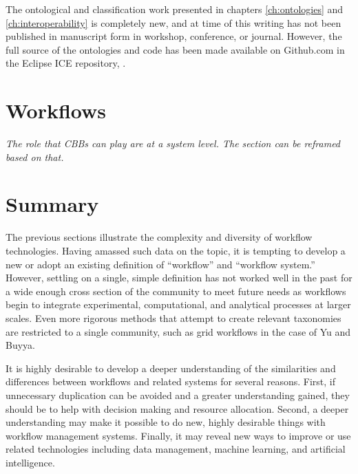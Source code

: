 The ontological and classification work presented in chapters
\ref{ch:ontologies} and \ref{ch:interoperability} is completely new, and at
time of this writing has not been published in manuscript form in
workshop, conference, or journal. However, the full source of the ontologies
and code has been made available on Github.com in the Eclipse ICE repository,
\cite{billings_ice}.


\section{Workflows}

\textit{The role that CBBs can play are at a system level. The section can be
reframed based on that.}


\section{Summary}

The previous sections illustrate the complexity and diversity of workflow
technologies. Having amassed such data on the topic, it is tempting to develop
a new or adopt an existing definition of ``workflow'' and ``workflow system.''
However, settling on a single, simple definition has not worked well in the past
for a wide enough cross section of the community to meet future needs as workflows
begin to integrate experimental, computational, and analytical processes at
larger scales. Even more rigorous methods that attempt to create relevant
taxonomies are restricted to a single community, such as grid workflows in the
case of Yu and Buyya.

It is highly desirable to develop a deeper understanding of the similarities and
differences between workflows and related systems for several reasons. First, if
unnecessary duplication can be avoided and a greater understanding gained, they
should be to help with decision making and resource allocation. Second, a
deeper understanding may make it possible to do new, highly desirable things
with workflow management systems. Finally, it may reveal new ways to improve or
use related technologies including data management, machine learning, and
artificial intelligence.


